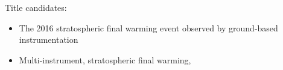 Title candidates:
\begin{itemize}
\item The 2016 stratospheric final warming event observed by ground-based instrumentation
\item Multi-instrument, 
stratospheric final warming,


\end{itemize}